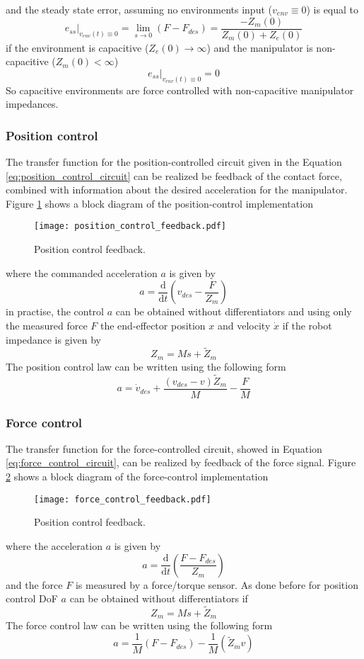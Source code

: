 and the steady state error, assuming no environments input ($v_{env} \equiv 0$) is equal to 
\[
e_{ss} \Big|_{v_{env}(t) \equiv 0} = \lim_{s \to 0}(F - F_{des}) = \frac{-Z_m(0)}{Z_m(0) + Z_e(0)}
\]
if the environment is capacitive ($Z_e(0) \rightarrow \infty$) and the manipulator is non-capacitive ($Z_m(0) < \infty$)
\[
e_{ss} \Big|_{v_{env}(t) \equiv 0} = 0
\]
So capacitive environments are force controlled with non-capacitive manipulator impedances.

\subsubsection{Position control}
The transfer function for the position-controlled circuit given in the Equation \ref{eq:position_control_circuit} can be realized be feedback of the contact force,
combined with information about the desired acceleration for the
manipulator. Figure \ref{fig:position_control_feedback} shows a block diagram of the position-control implementation
\begin{figure}[h]
  \centering
  \texttt{[image: position\_control\_feedback.pdf]}
  \caption{Position control feedback. \label{fig:position_control_feedback}}
\end{figure}
where the commanded acceleration $a$ is given by
\[
a = \frac{\mathrm{d}}{\mathrm{d}t} \left(v_{des} - \frac{F}{Z_m}\right)
\]
in practise, the control $a$ can be obtained without differentiators and using only the measured force $F$ the end-effector position $x$ and velocity $\dot{x}$ if the robot impedance is given by
\[
Z_m = Ms + \tilde{Z}_{m}
\]
The position control law can be written using the following form
\begin{equation}
  \label{eq:position_law}
  a = \dot{v}_{des} + \frac{(v_{des} - v)\tilde{Z}_m}{M} - \frac{F}{M}
\end{equation}

\subsubsection{Force control}
The transfer function for the force-controlled circuit, showed in Equation \ref{eq:force_control_circuit}, can be realized by feedback of the force signal.
Figure \ref{fig:force_control_feedback} shows a block diagram of the force-control implementation
\begin{figure}[h]
  \centering
  \texttt{[image: force\_control\_feedback.pdf]}
  \caption{Position control feedback. \label{fig:force_control_feedback}}
\end{figure}
where the acceleration $a$ is given by
\[
a = \frac{\mathrm{d}}{\mathrm{d}t} \left(\frac{F - F_{des}}{Z_m} \right)
\]
and the force $F$ is measured by a force/torque sensor.
As done before for position control DoF $a$ can be obtained without differentiators if
\[
Z_m = Ms + \tilde{Z}_{m}
\]
The force control law can be written using the following form
\begin{equation}
  \label{eq:force_law}
  a = \frac{1}{M} (F - F_{des}) - \frac{1}{M}( \tilde{Z}_m v)
\end{equation}


